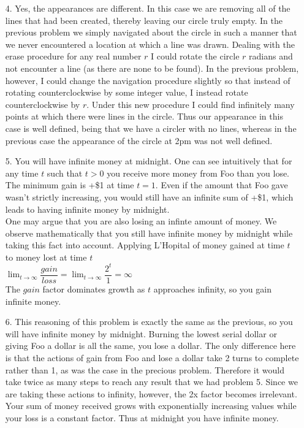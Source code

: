 \documentclass{article}
\begin{document}
\begin{enumerate}
\bigskip

\item[4.]
	Yes, the appearances are different. In this case we are removing all of the lines that had been created, thereby leaving our circle truly empty. In the previous problem we simply navigated about the circle in such a manner that we never encountered a location at which a line was drawn. Dealing with the erase procedure for any real number $r$ I could rotate the circle $r$ radians and not encounter a line (as there are none to be found). In the previous problem, however, I could change the navigation procedure slightly so that instead of rotating counterclockwise by some integer value, I instead rotate counterclockwise by $r$. Under this new procedure I could find infinitely many points at which there were lines in the circle. Thus our appearance in this case is well defined, being that we have a circler with no lines, whereas in the previous case the appearance of the circle at 2pm was not well defined.

\newpage

\item[5.]
	You will have infinite money at midnight. One can see intuitively that for any time $t$ such that $t>0$ you receive more money from Foo than you lose. The minimum gain is +\$1 at time $t=1$. Even if the amount that Foo gave wasn't strictly increasing, you would still have an infinite sum of +\$1, which leads to having infinite money by midnight.\\
	
	One may argue that you are also losing an infinte amount of money. We observe mathematically that you still have infinite money by midnight while taking this fact into account. Applying L'Hopital of money gained at time $t$ to money lost at time $t$\\
	
	$\displaystyle\lim_{t \to \infty} \dfrac{gain}{loss} = \lim_{t \to \infty} \dfrac{2^t}{1} = \infty$\\
	
	The $gain$ factor dominates growth as $t$ approaches infinity, so you gain infinite money.

\bigskip

\item[6.]
	This reasoning of this problem is exactly the same as the previous, so you will have infinite money by midnight. Burning the lowest serial dollar or giving Foo a dollar is all the same, you lose a dollar. The only difference here is that the actions of gain from Foo and lose a dollar take 2 turns to complete rather than 1, as was the case in the precious problem. Therefore it would take twice as many steps to reach any result that we had problem 5. Since we are taking these actions to infinity, however, the 2x factor becomes irrelevant. Your sum of money received grows with exponentially increasing values while your loss is a constant factor. Thus at midnight you have infinite money.

\end{enumerate}
\end{document}
